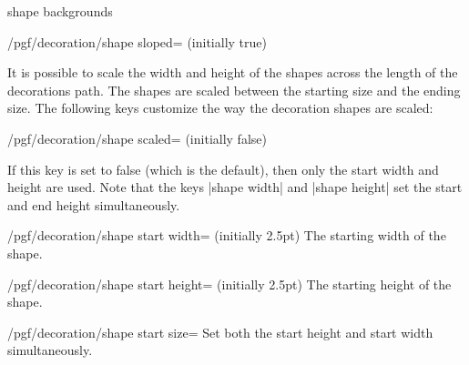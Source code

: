 \begin{decoration}{shape backgrounds}
\begin{key}{/pgf/decoration/shape sloped= (initially true)}
\begin{codeexample}[]
\end{codeexample}
  \end{key}%

  It is possible to scale the width and height of the shapes across the
  length of the decorations path. The shapes are scaled between the starting
  size and the ending size. The following keys customize the way the
  decoration shapes are scaled:

  \begin{key}{/pgf/decoration/shape scaled= (initially false)}
\begin{codeexample}[]
\end{codeexample}

    If this key is set to false (which is the default), then only the
    start width and height are used. Note that the keys |shape width|
    and |shape height| set the start and end height simultaneously.
  \end{key}

  \begin{key}{/pgf/decoration/shape start width= (initially 2.5pt)}
    The starting width of the shape.
  \end{key}%

  \begin{key}{/pgf/decoration/shape start height= (initially 2.5pt)}
    The starting height of the shape.
  \end{key}%

  \begin{stylekey}{/pgf/decoration/shape start size=}
    Set both the start height and start width simultaneously.
  \end{stylekey}%


\end{decoration}
